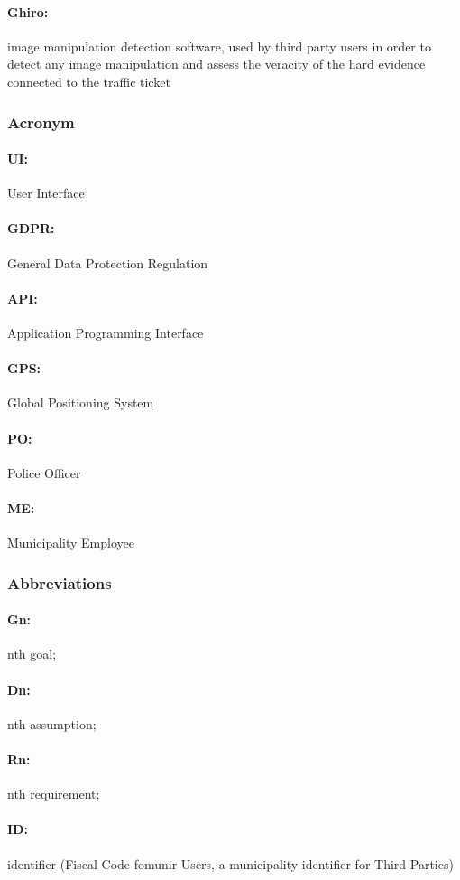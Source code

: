 \documentclass{article}
\begin{document}
\paragraph{Ghiro:} image manipulation detection software, used by third party
users in order to detect any image manipulation and assess the veracity of the
hard evidence connected to the traffic ticket
\subsubsection{Acronym}
\paragraph{UI:} User Interface \paragraph{GDPR:} General Data Protection
Regulation \paragraph{API:} Application Programming Interface \paragraph{GPS:}
Global Positioning System \paragraph{PO:} Police Officer \paragraph{ME:}
Municipality Employee
\subsubsection{Abbreviations}
\paragraph{Gn:} nth goal; \paragraph{Dn:} nth assumption; \paragraph{Rn:} nth
requirement; \paragraph{ID: } identifier (Fiscal Code fomunir Users, a
municipality identifier for Third Parties)
\end{document}
